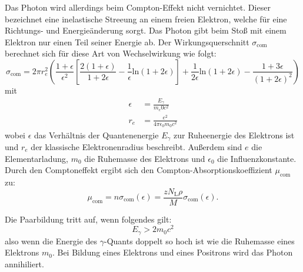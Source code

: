 Das Photon wird allerdings beim Compton-Effekt nicht vernichtet. Dieser bezeichnet eine inelastische Streeung an einem freien Elektron, welche für eine Richtungs- und Energieänderung sorgt. Das Photon gibt beim Stoß mit einem Elektron nur einen Teil seiner Energie ab. Der Wirkungsquerschnitt $\sigma_\text{com}$ berechnet sich für diese Art von Wechselwirkung wie folgt:
\begin{equation}
\sigma_\text{com} = 2 \pi r_e^2 \left(\frac{1+\epsilon}{\epsilon^{2}}\left[\frac{2(1+\epsilon)}{1+2\epsilon}-\frac{1}{\epsilon}\text{ln}(1+2\epsilon)\right]+\frac{1}{2\epsilon}\text{ln}(1+2\epsilon)-\frac{1+3\epsilon}{(1+2\epsilon)^2}\right)
\label{eq:wirkungsquerschnitt}
\end{equation}
mit \begin{align*}
\epsilon &= \frac{E_\gamma}{m_e0 c^2} \\
r_e &= \frac{e^2}{4 \pi \epsilon_0 m_0 c^2}
\end{align*}
wobei $\epsilon$ das Verhältnis der Quantenenergie $E_\gamma$ zur Ruheenergie des Elektrons ist und $r_e$ der klassische Elektronenradius beschreibt. Außerdem sind $e$ die Elementarladung, $m_0$ die Ruhemasse des Elektrons und $\epsilon_0$ die Influenzkonstante. Durch den Comptoneffekt ergibt sich den Compton-Absorptionskoeffizient $\mu_\text{com}$ zu:
\begin{equation}
\mu_\text{com} = n\sigma_\text{com}(\epsilon) = \frac{zN_\text{L}\rho}{M}\sigma_\text{com}(\epsilon).
\label{eq:absorptionskoeffizient}
\end{equation}

Die Paarbildung tritt auf, wenn folgendes gilt:
\begin{equation*}
E_\gamma > 2m_0c^2
\end{equation*}
also wenn die Energie des $\gamma$-Quants doppelt so hoch ist wie die Ruhemasse eines Elektrons $m_0$. Bei Bildung eines Elektrons und eines Positrons wird das Photon annihiliert. 

